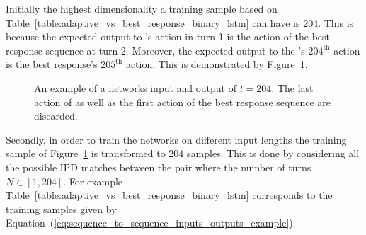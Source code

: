 Initially the highest dimensionality a training sample based on
Table~\ref{table:adaptive_vs_best_response_binary_lstm} can have is 204.
This is because the expected output to \Adaptive's action in turn 1 is
the action of the best response sequence at turn 2. Moreover, the expected
output to the \Adaptive's \(204^{\text{th}}\) action is the best response's
\(205^{\text{th}}\) action. This is demonstrated by
Figure~\ref{fig:input_output_example}.

\begin{figure}[!htbp]
    \centering
    
    \caption{An example of a networks input and output of \(t=204\). The last
    action of \Adaptive as well as the first action of the best
    response sequence are discarded.}\label{fig:input_output_example}
\end{figure}

Secondly, in order to train the networks on different input lengths the training
sample of Figure~\ref{fig:input_output_example} is transformed to 204 samples.
This is done by considering all the possible IPD matches between
the pair where the number of turns \(N \in [1, 204]\). For example
Table~\ref{table:adaptive_vs_best_response_binary_lstm} corresponds to the
training samples given by Equation~(\ref{eq:sequence_to_sequence_inputs_outputs_example}).

